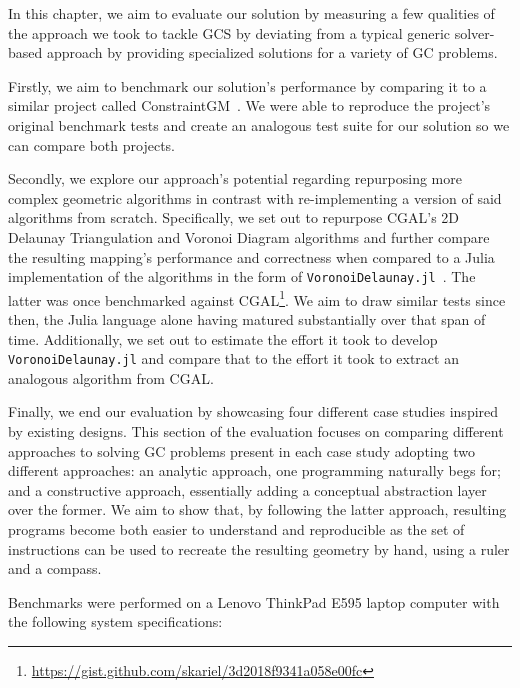%
\label{chap:eval}
\cleardoublepage{}

\noindent In this chapter, we aim to evaluate our solution by measuring a few
qualities of the approach we took to tackle \ac{GCS} by deviating from a typical
generic solver-based approach by providing specialized solutions for a variety
of \ac{GC} problems.

Firstly, we aim to benchmark our solution's performance by comparing it to a
similar project called ConstraintGM~\cite{Pinheiro:2016:MGR}.  We were able to
reproduce the project's original benchmark tests and create an analogous test
suite for our solution so we can compare both projects.

Secondly, we explore our approach's potential regarding repurposing more complex
geometric algorithms in contrast with re-implementing a version of said
algorithms from scratch.  Specifically, we set out to repurpose \ac{CGAL}'s 2D
Delaunay Triangulation and Voronoi Diagram algorithms and further compare the
resulting mapping's performance and correctness when compared to a Julia
implementation of the algorithms in the form of
\texttt{VoronoiDelaunay.jl}~\cite{Keselman:2014:VoronoiDelaunay.jl}.  The latter
was once benchmarked against
\ac{CGAL}\footnote{\url{https://gist.github.com/skariel/3d2018f9341a058e00fc}}.
We aim to draw similar tests since then, the Julia language alone having matured
substantially over that span of time.  Additionally, we set out to estimate the
effort it took to develop \texttt{VoronoiDelaunay.jl} and compare that to the
effort it took to extract an analogous algorithm from \ac{CGAL}.

Finally, we end our evaluation by showcasing four different case studies
inspired by existing designs.  This section of the evaluation focuses on
comparing different approaches to solving \ac{GC} problems present in each case
study adopting two different approaches: an analytic approach, one programming
naturally begs for; and a constructive approach, essentially adding a conceptual
abstraction layer over the former.  We aim to show that, by following the latter
approach, resulting programs become both easier to understand and reproducible
as the set of instructions can be used to recreate the resulting geometry by
hand, using a ruler and a compass.

Benchmarks were performed on a Lenovo ThinkPad E595 laptop computer with the
following system specifications:

